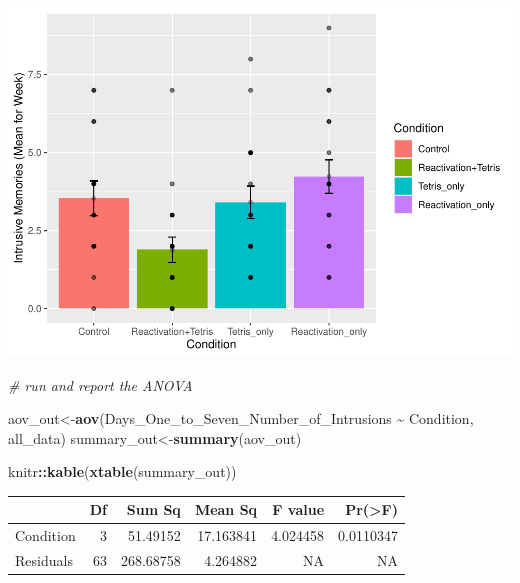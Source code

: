 \documentclass[
]{book}
\newenvironment{Shaded}{\begin{snugshade}}{\end{snugshade}}
\newcommand{\CommentTok}[1]{\textcolor[rgb]{0.56,0.35,0.01}{\textit{#1}}}
\newcommand{\FunctionTok}[1]{\textcolor[rgb]{0.13,0.29,0.53}{\textbf{#1}}}
\newcommand{\NormalTok}[1]{#1}
\newcommand{\OtherTok}[1]{\textcolor[rgb]{0.56,0.35,0.01}{#1}}
\newcommand{\SpecialCharTok}[1]{\textcolor[rgb]{0.81,0.36,0.00}{\textbf{#1}}}
\begin{document}
\includegraphics{Statistics_Lab_files/figure-latex/unnamed-chunk-402-1.pdf}

\begin{Shaded}
\begin{Highlighting}[]
\CommentTok{\# run and report the ANOVA}

\NormalTok{aov\_out}\OtherTok{\textless{}{-}}\FunctionTok{aov}\NormalTok{(Days\_One\_to\_Seven\_Number\_of\_Intrusions }\SpecialCharTok{\textasciitilde{}}\NormalTok{ Condition, all\_data)}
\NormalTok{summary\_out}\OtherTok{\textless{}{-}}\FunctionTok{summary}\NormalTok{(aov\_out)}

\NormalTok{knitr}\SpecialCharTok{::}\FunctionTok{kable}\NormalTok{(}\FunctionTok{xtable}\NormalTok{(summary\_out))}
\end{Highlighting}
\end{Shaded}

\begin{tabular}{l|r|r|r|r|r}
\hline
  & Df & Sum Sq & Mean Sq & F value & Pr(>F)\\
\hline
Condition & 3 & 51.49152 & 17.163841 & 4.024458 & 0.0110347\\
\hline
Residuals & 63 & 268.68758 & 4.264882 & NA & NA\\
\hline
\end{tabular}
\end{document}
